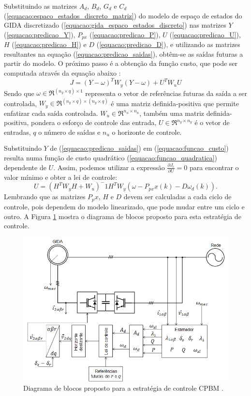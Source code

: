	Substituindo as matrizes $A_d$, $B_d$, $G_d$ e $C_d$ (\ref{equacao:espaco_estados_discreto_matriz}) do modelo de espaço de estados do GIDA discretizado (\ref{equacao:gida_espaco_estados_discreto}) nas matrizes $Y$ (\ref{equacao:predicao_Y}), $P_{px}$ (\ref{equacao:predicao_P}), $U$ (\ref{equacao:predicao_U}), $H$ (\ref{equacao:predicao_H}) e $D$ (\ref{equacao:predicao_D}), e utilizando as matrizes resultantes na equação (\ref{equacao:predicao_saidas}), obtêm-se as saídas futuras a partir do modelo. O próximo passo é a obtenção da função custo, que pode ser computada através da equação abaixo \cite{alfeucustominimizado,alfeu}:
	\begin{equation}
		\label{equacao:funcao_custo}
		J=(Y-\omega)^TW_y(Y-\omega)+U^TW_uU
	\end{equation}
	Sendo que $\omega \in \Re^{(n_y \times q) \times 1}$ representa o vetor de referências futuras da saída a ser controlada, $W_y \in \Re^{(n_y \times q)\times (n_y \times q)}$ é uma matriz definida-positiva que permite enfatizar cada saída controlada. $W_u \in \Re^{n_u \times n_u}$, também uma matriz definida-positiva, pondera o esforço de controle das entrada, $U \in \Re^{n_y \times n_y}$ é o vetor de entradas, $q$ o número de saídas e $n_u$ o horizonte de controle.
	
	Substituindo $Y$ de (\ref{equacao:predicao_saidas}) em (\ref{equacao:funcao_custo}) resulta numa função de custo quadrático (\ref{equacao:funcao_quadratica}) dependente de $U$. Assim, podemos utilizar a expressão $\frac{\partial J_c}{\partial U} = 0$ para encontrar o valor mínimo e obter a lei de controle:
	\begin{equation}
		\label{equacao:lei_controle}
		U=(H^TW_yH+W_u)^-1H^TW_y(\omega - P_{px}x(k)-D\omega_d(k)).
	\end{equation}
	Lembrando que as matrizes $P_px$, $H$ e $D$ devem ser calculadas a cada ciclo de controle, pois dependem do modelo linearizado, que pode mudar entre um ciclo e outro. A Figura \ref{figura:gida_preditivo_esquema} mostra o diagrama de blocos proposto para esta estratégia de controle.
	\begin{figure}[ht]
		\centering
		\includegraphics[width=1\textwidth]{Figuras/gida_esquematico_preditivo.png}
		\caption{Diagrama de blocos proposto para a estratégia de controle CPBM \cite{paperalfeu}.}
		\label{figura:gida_preditivo_esquema}
	\end{figure}

